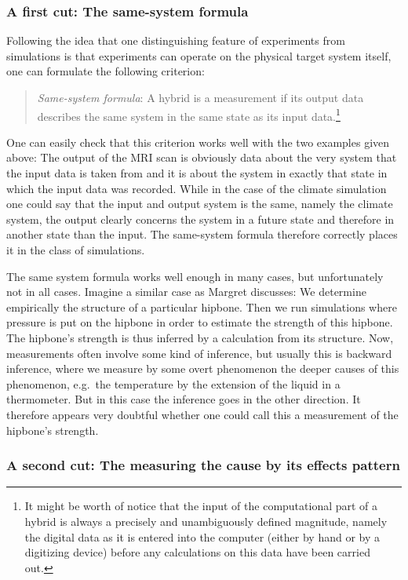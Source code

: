 \documentclass[12pt, a4paper]{article}
\numberwithin{equation}{section}
\begin{document}
\subsubsection{A first cut: The same-system formula}

Following the idea that one distinguishing feature of experiments from simulations is that experiments can operate on the physical target system itself, one can formulate the following criterion:

\begin{quote}
{\em Same-system formula}: A hybrid is a measurement if its output data describes the same system in the same state as its input data.\footnote{It might be worth of notice that the input of the computational part of a hybrid is always a precisely and unambiguously defined magnitude, namely the digital data as it is entered into the computer (either by hand or by a digitizing device) before any calculations on this data have been carried out.}
\end{quote} 

One can easily check that this criterion works well with the two examples given above: The output of the MRI scan is obviously data about the very system that the input data is taken from and it is about the system in exactly that state in which the input data was recorded. While in the case of the climate simulation one could say that the input and output system is the same, namely the climate system, the output clearly concerns the system in a future state and therefore in another state than the input. The same-system formula therefore correctly places it in the class of simulations.

The same system formula works well enough in many cases, but unfortunately not in all cases. Imagine a similar case as Margret \citet{morgan:2003}
discusses: We determine empirically the structure of a particular hipbone. Then we run simulations where pressure is put on the hipbone in order to estimate the strength of this hipbone. The hipbone's strength is thus inferred by a calculation from its structure. Now, measurements often involve some kind of inference, but usually this is backward inference, where we measure by some overt phenomenon the deeper causes of this phenomenon, e.g.\ the temperature by the extension of the liquid in a thermometer. But in this case the inference goes in the other direction. It therefore appears very doubtful whether one could call this a measurement of the hipbone's strength.

 
\subsubsection{A second cut: The measuring the cause by its effects pattern}
\end{document}
